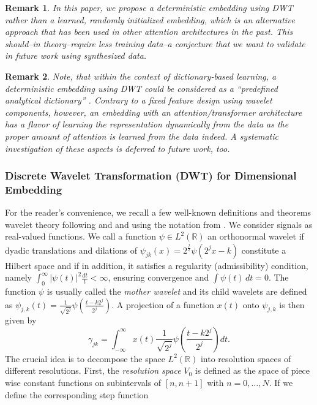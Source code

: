 \documentclass{ieeeaccess}
\newcommand{\todo}[1]{\textbf{\ \textcolor{red}{#1}}}
\newtheorem{remark}{Remark}
\begin{document}
\begin{remark} In this paper, we propose a deterministic embedding using DWT rather than a learned, randomly initialized embedding, which is an alternative approach that has been used in other attention architectures in the past. This should--in theory--require less training data--a conjecture that we want to validate in future work using synthesized data.
\end{remark} 
\begin{remark} Note, that within the context of dictionary-based learning, a deterministic embedding using DWT could be considered as a ``predefined analytical dictionary'' \cite{Mathews}. Contrary to a fixed feature design using wavelet components, however, an embedding with an attention/transformer architecture has a flavor of learning the representation dynamically from the data as the proper amount of \emph{attention} is learned from the data indeed. A systematic investigation of these aspects is deferred to future work, too.
\end{remark} 

\subsubsection{Discrete Wavelet Transformation (DWT) for Dimensional Embedding}
For the reader's convenience, we recall a few well-known definitions and theorems wavelet theory following \cite{Daubechies} and \cite{MallatEtAl} and using the notation from \cite{Ryan}.
We consider signals as real-valued functions. We call a function $\psi\in L^2(\mathbb{R})$ an orthonormal wavelet if dyadic translations and dilations of $\psi _{{jk}}(x)=2^{{\frac  {j}{2}}}\psi \left(2^{j}x-k\right)$ constitute a Hilbert space and if in addition, it satisfies a regularity (admissibility) condition, namely $\int_0^\infty |\psi(t)|^2 \frac{dt}{t}<\infty$, ensuring convergence and $\int \psi(t)\, dt =0$. The function  $\psi$ is usually called the \emph{mother wavelet} and its child wavelets are defined as 
$\psi_{j,k}(t)= \frac{1}{\sqrt{2^j}} \psi \left( \frac{t - k 2^j}{2^j} \right)$. A projection of a function $x(t)$ onto $\psi_{j,k}$ is then given by
\begin{equation}
 \gamma_{jk} = \int_{-\infty}^{\infty} x(t)  \frac{1}{\sqrt{2^j}} \psi \left( \frac{t - k 2^j}{2^j} \right) dt.
\end{equation}
The crucial idea is to decompose the space $L^2(\mathbb{R})$ into resolution spaces of different resolutions. First, the \emph{resolution space} $V_0$ is defined as the space of piece wise constant functions on subintervals of $[n, n+1]$ with $n=0,\ldots, N$. If we define the corresponding step function  
\end{document}
